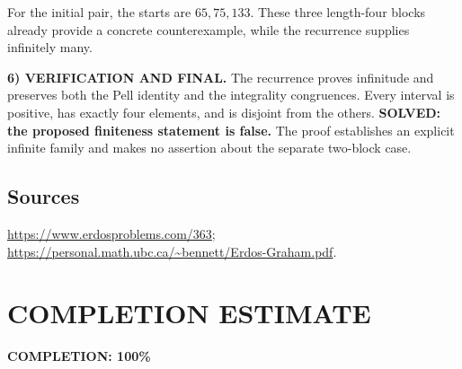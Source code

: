 For the initial pair, the starts are $65,75,133$. These three length-four blocks already provide a concrete counterexample, while the recurrence supplies infinitely many.

\noindent\textbf{6) VERIFICATION AND FINAL.}
The recurrence proves infinitude and preserves both the Pell identity and the integrality congruences. Every interval is positive, has exactly four elements, and is disjoint from the others. \textbf{SOLVED: the proposed finiteness statement is false.} The proof establishes an explicit infinite family and makes no assertion about the separate two-block case.

\subsection*{Sources}
\url{https://www.erdosproblems.com/363}; \url{https://personal.math.ubc.ca/~bennett/Erdos-Graham.pdf}.

\section{COMPLETION ESTIMATE}
\textbf{COMPLETION: 100\%}
